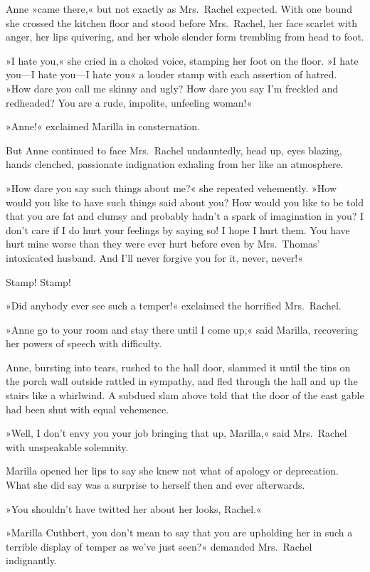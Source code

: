 Anne »came there,« but not exactly as Mrs.~Rachel expected. With one bound she crossed the kitchen floor and stood before Mrs.~Rachel, her face scarlet with anger, her lips quivering, and her whole slender form trembling from head to foot.

»I hate you,« she cried in a choked voice, stamping her foot on the floor. »I hate you—I hate you—I hate you\longdash« a louder stamp with each assertion of hatred. »How dare you call me skinny and ugly? How dare you say I'm freckled and redheaded? You are a rude, impolite, unfeeling woman!«

»Anne!« exclaimed Marilla in consternation.

But Anne continued to face Mrs.~Rachel undauntedly, head up, eyes blazing, hands clenched, passionate indignation exhaling from her like an atmosphere.

»How dare you say such things about me?« she repeated vehemently. »How would you like to have such things said about you? How would you like to be told that you are fat and clumsy and probably hadn't a spark of imagination in you? I don't care if I do hurt your feelings by saying so! I hope I hurt them. You have hurt mine worse than they were ever hurt before even by Mrs.~Thomas' intoxicated husband. And I'll never forgive you for it, never, never!«

Stamp! Stamp!

»Did anybody ever see such a temper!« exclaimed the horrified Mrs.~Rachel.

»Anne go to your room and stay there until I come up,« said Marilla, recovering her powers of speech with difficulty.

Anne, bursting into tears, rushed to the hall door, slammed it until the tins on the porch wall outside rattled in sympathy, and fled through the hall and up the stairs like a whirlwind. A subdued slam above told that the door of the east gable had been shut with equal vehemence.

»Well, I don't envy you your job bringing that up, Marilla,« said Mrs.~Rachel with unspeakable solemnity.

Marilla opened her lips to say she knew not what of apology or deprecation. What she did say was a surprise to herself then and ever afterwards.

»You shouldn't have twitted her about her looks, Rachel.«

»Marilla Cuthbert, you don't mean to say that you are upholding her in such a terrible display of temper as we've just seen?« demanded Mrs.~Rachel indignantly.

